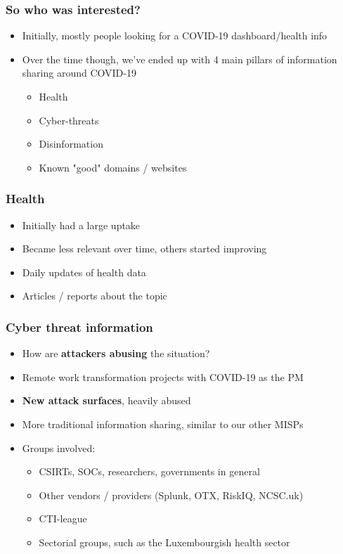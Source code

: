 \begin{frame}
 \frametitle{So who was interested?}
 \begin{itemize}
         \item Initially, mostly people looking for a COVID-19 dashboard/health info
         \item Over the time though, we've ended up with 4 main pillars of information sharing around COVID-19
         \begin{itemize}
              \item Health
              \item Cyber-threats
              \item Disinformation
              \item Known "good" domains / websites
         \end{itemize}
 \end{itemize}
\end{frame}

\begin{frame}
 \frametitle{Health}
 \begin{itemize}
         \item Initially had a large uptake
         \item Became less relevant over time, others started improving
         \item Daily updates of health data
         \item Articles / reports about the topic
 \end{itemize}
\end{frame}

\begin{frame}
 \frametitle{Cyber threat information}
 \begin{itemize}
         \item How are {\bf attackers abusing} the situation?
         \item Remote work transformation projects with COVID-19 as the PM
         \item {\bf New attack surfaces}, heavily abused
         \item More traditional information sharing, similar to our other MISPs
         \item Groups involved:
         \begin{itemize}
              \item CSIRTs, SOCs, researchers, governments in general
              \item Other vendors / providers (Splunk, OTX, RiskIQ, NCSC.uk)
              \item CTI-league
              \item Sectorial groups, such as the Luxembourgish health sector
         \end{itemize}
 \end{itemize}
\end{frame}

